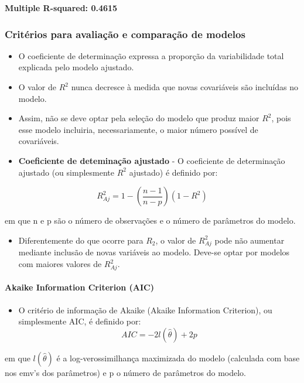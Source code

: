 \documentclass[
]{article}
\providecommand{\tightlist}{%
  \setlength{\itemsep}{0pt}\setlength{\parskip}{0pt}}
\begin{document}
{\textbf{Multiple R-squared: 0.4615}

\subsubsection{Critérios para avaliação e comparação de
modelos}\label{crituxe9rios-para-avaliauxe7uxe3o-e-comparauxe7uxe3o-de-modelos-1}

\begin{itemize}
\item
  O coeficiente de determinação expressa a proporção da variabilidade
  total explicada pelo modelo ajustado.
\item
  O valor de \(R^2\) nunca decresce à medida que novas covariáveis são
  incluídas no modelo.
\item
  Assim, não se deve optar pela seleção do modelo que produz maior
  \(R^2\), pois esse modelo incluiria, necessariamente, o maior número
  possível de covariáveis.
\item
  \textbf{Coeficiente de deteminação ajustado} - O coeficiente de
  determinação ajustado (ou simplesmente \(R^2\) ajustado) é definido
  por:
\end{itemize}

\[
R_{Aj}^2 = 1 - (\frac{n-1}{n-p}) (1 - R^2)
\]

em que n e p são o número de observações e o número de parâmetros do
modelo.

\begin{itemize}
\tightlist
\item
  Diferentemente do que ocorre para \(R_2\), o valor de \(R_{Aj}^2\)
  pode não aumentar mediante inclusão de novas variáveis ao modelo.
  Deve-se optar por modelos com maiores valores de \(R_{Aj}^2\).
\end{itemize}

\paragraph{Akaike Information Criterion
(AIC)}\label{akaike-information-criterion-aic}

\begin{itemize}
\tightlist
\item
  O critério de informação de Akaike (Akaike Information Criterion), ou
  simplesmente AIC, é definido por: \[
  AIC = -2l(\hat{\theta}) + 2p
  \]
\end{itemize}

em que \(l(\hat{\theta})\) é a log-verossimilhança maximizada do modelo
(calculada com base nos emv's dos parâmetros) e p o número de parâmetros
do modelo.

}
\end{document}
